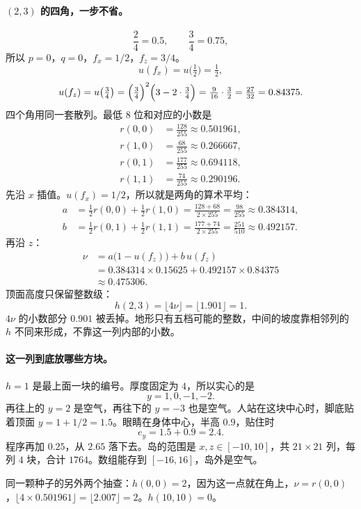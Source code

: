 \documentclass[12pt,a4paper]{article}
\theoremstyle{definition}
\theoremstyle{plain}
\theoremstyle{remark}
\begin{document}
\paragraph{\((2,3)\) 的四角，一步不省。}
\[
\frac{2}{4}=0.5,\qquad \frac{3}{4}=0.75,
\]
所以 \(p=0\)，\(q=0\)，\(f_x=1/2\)，\(f_z=3/4\)。
\[
u(f_x)=u\bigl(\tfrac12\bigr)=\tfrac12,
\]
\[
u(f_z)=u\bigl(\tfrac34\bigr)
=\Bigl(\tfrac34\Bigr)^2\Bigl(3-2\cdot\tfrac34\Bigr)
=\tfrac{9}{16}\cdot\tfrac{3}{2}
=\tfrac{27}{32}=0.84375.
\]
四个角用同一套散列。最低 \(8\) 位和对应的小数是
\begin{align*}
r(0,0)&=\frac{128}{255}\approx 0.501961,\\
r(1,0)&=\frac{68}{255}\approx 0.266667,\\
r(0,1)&=\frac{177}{255}\approx 0.694118,\\
r(1,1)&=\frac{74}{255}\approx 0.290196.
\end{align*}
先沿 \(x\) 插值。\(u(f_x)=1/2\)，所以就是两角的算术平均：
\begin{align*}
a&=\frac{1}{2}r(0,0)+\frac{1}{2}r(1,0)
=\frac{128+68}{2\times 255}
=\frac{98}{255}\approx 0.384314,\\[4pt]
b&=\frac{1}{2}r(0,1)+\frac{1}{2}r(1,1)
=\frac{177+74}{2\times 255}
=\frac{251}{510}\approx 0.492157.
\end{align*}
再沿 \(z\)：
\begin{align*}
\nu
&=a\bigl(1-u(f_z)\bigr)+b\,u(f_z)\\
&=0.384314\times 0.15625+0.492157\times 0.84375\\
&\approx 0.475306.
\end{align*}
顶面高度只保留整数级：
\[
h(2,3)=\lfloor 4\nu\rfloor=\lfloor 1.901\rfloor=1.
\]
\(4\nu\) 的小数部分 \(0.901\) 被丢掉。地形只有五档可能的整数，中间的坡度靠相邻列的 \(h\) 不同来形成，不靠这一列内部的小数。

\paragraph{这一列到底放哪些方块。}
\(h=1\) 是最上面一块的编号。厚度固定为 \(4\)，所以实心的是
\[
y=1,0,-1,-2.
\]
再往上的 \(y=2\) 是空气，再往下的 \(y=-3\) 也是空气。人站在这块中心时，脚底贴着顶面 \(y=1+1/2=1.5\)。眼睛在身体中心，半高 \(0.9\)，贴住时
\[
e_y=1.5+0.9=2.4.
\]
程序再加 \(0.25\)，从 \(2.65\) 落下去。岛的范围是 \(x,z\in[-10,10]\)，共 \(21\times 21\) 列，每列 \(4\) 块，合计 \(1764\)。数组能存到 \([-16,16]\)，岛外是空气。

同一颗种子的另外两个抽查：\(h(0,0)=2\)，因为这一点就在角上，\(\nu=r(0,0)\)，\(\lfloor 4\times 0.501961\rfloor=\lfloor 2.007\rfloor=2\)。\(h(10,10)=0\)。
\end{document}
